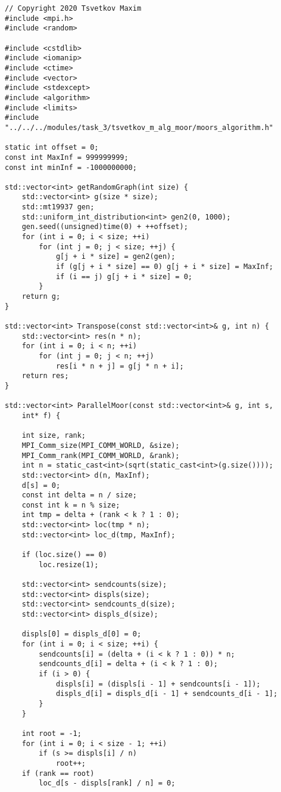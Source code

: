 \documentclass{report}
\begin{document}
\begin{lstlisting}
// Copyright 2020 Tsvetkov Maxim
#include <mpi.h>
#include <random>

#include <cstdlib>
#include <iomanip>
#include <ctime>
#include <vector>
#include <stdexcept>
#include <algorithm>
#include <limits>
#include "../../../modules/task_3/tsvetkov_m_alg_moor/moors_algorithm.h"

static int offset = 0;
const int MaxInf = 999999999;
const int minInf = -1000000000;

std::vector<int> getRandomGraph(int size) {
    std::vector<int> g(size * size);
    std::mt19937 gen;
    std::uniform_int_distribution<int> gen2(0, 1000);
    gen.seed((unsigned)time(0) + ++offset);
    for (int i = 0; i < size; ++i)
        for (int j = 0; j < size; ++j) {
            g[j + i * size] = gen2(gen);
            if (g[j + i * size] == 0) g[j + i * size] = MaxInf;
            if (i == j) g[j + i * size] = 0;
        }
    return g;
}

std::vector<int> Transpose(const std::vector<int>& g, int n) {
    std::vector<int> res(n * n);
    for (int i = 0; i < n; ++i)
        for (int j = 0; j < n; ++j)
            res[i * n + j] = g[j * n + i];
    return res;
}

std::vector<int> ParallelMoor(const std::vector<int>& g, int s,
    int* f) {

    int size, rank;
    MPI_Comm_size(MPI_COMM_WORLD, &size);
    MPI_Comm_rank(MPI_COMM_WORLD, &rank);
    int n = static_cast<int>(sqrt(static_cast<int>(g.size())));
    std::vector<int> d(n, MaxInf);
    d[s] = 0;
    const int delta = n / size;
    const int k = n % size;
    int tmp = delta + (rank < k ? 1 : 0);
    std::vector<int> loc(tmp * n);
    std::vector<int> loc_d(tmp, MaxInf);

    if (loc.size() == 0)
        loc.resize(1);

    std::vector<int> sendcounts(size);
    std::vector<int> displs(size);
    std::vector<int> sendcounts_d(size);
    std::vector<int> displs_d(size);

    displs[0] = displs_d[0] = 0;
    for (int i = 0; i < size; ++i) {
        sendcounts[i] = (delta + (i < k ? 1 : 0)) * n;
        sendcounts_d[i] = delta + (i < k ? 1 : 0);
        if (i > 0) {
            displs[i] = (displs[i - 1] + sendcounts[i - 1]);
            displs_d[i] = displs_d[i - 1] + sendcounts_d[i - 1];
        }
    }

    int root = -1;
    for (int i = 0; i < size - 1; ++i)
        if (s >= displs[i] / n)
            root++;
    if (rank == root)
        loc_d[s - displs[rank] / n] = 0;


\end{lstlisting}
\end{document}
